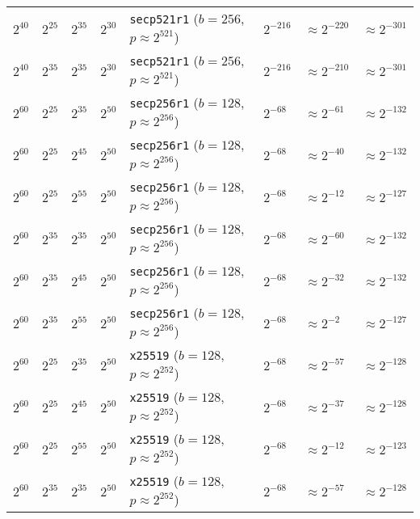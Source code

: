 \begin{table}[p]
{\begin{tabular}{@{}llllllll@{}}
\midrule
$2^{40}$	&$2^{25}$	&$2^{35}$	&$2^{30}$	&\texttt{secp521r1} ($b \!=\! 256$, \! $p \!\approx\! 2^{521}$)	&$2^{-216}$	&\cellcolor{green!25}$\approx 2^{-220}$	&\cellcolor{green!25}$\approx 2^{-301}$	\\
$2^{40}$	&$2^{35}$	&$2^{35}$	&$2^{30}$	&\texttt{secp521r1} ($b \!=\! 256$, \! $p \!\approx\! 2^{521}$)	&$2^{-216}$	&$\approx 2^{-210}$	& \cellcolor{green!25}$\approx 2^{-301}$	\\
\midrule[1pt]
$2^{60}$	&$2^{25}$	&$2^{35}$	&$2^{50}$	&\texttt{secp256r1} ($b \!=\! 128$, \! $p \!\approx\! 2^{256}$)	&$2^{-68}$	&$\approx 2^{-61}$	& \cellcolor{green!25}$\approx 2^{-132}$	\\
$2^{60}$	&$2^{25}$	&$2^{45}$	&$2^{50}$	&\texttt{secp256r1} ($b \!=\! 128$, \! $p \!\approx\! 2^{256}$)	&$2^{-68}$	&$\approx 2^{-40}$	& \cellcolor{green!25}$\approx 2^{-132}$	\\
$2^{60}$	&$2^{25}$	&$2^{55}$	&$2^{50}$	&\texttt{secp256r1} ($b \!=\! 128$, \! $p \!\approx\! 2^{256}$)	&$2^{-68}$	&$\approx 2^{-12}$	& \cellcolor{green!25}$\approx 2^{-127}$	\\
$2^{60}$	&$2^{35}$	&$2^{35}$	&$2^{50}$	&\texttt{secp256r1} ($b \!=\! 128$, \! $p \!\approx\! 2^{256}$)	&$2^{-68}$	&$\approx 2^{-60}$	& \cellcolor{green!25}$\approx 2^{-132}$	\\
$2^{60}$	&$2^{35}$	&$2^{45}$	&$2^{50}$	&\texttt{secp256r1} ($b \!=\! 128$, \! $p \!\approx\! 2^{256}$)	&$2^{-68}$	&$\approx 2^{-32}$	& \cellcolor{green!25}$\approx 2^{-132}$	\\
$2^{60}$	&$2^{35}$	&$2^{55}$	&$2^{50}$	&\texttt{secp256r1} ($b \!=\! 128$, \! $p \!\approx\! 2^{256}$)	&$2^{-68}$	&$\approx 2^{-2}$	& \cellcolor{green!25}$\approx 2^{-127}$	\\
\midrule
$2^{60}$	&$2^{25}$	&$2^{35}$	&$2^{50}$	&\texttt{x25519} ($b \!=\! 128$, \! $p \!\approx\! 2^{252}$)	&$2^{-68}$	&$\approx 2^{-57}$	& \cellcolor{green!25}$\approx 2^{-128}$	\\
$2^{60}$	&$2^{25}$	&$2^{45}$	&$2^{50}$	&\texttt{x25519} ($b \!=\! 128$, \! $p \!\approx\! 2^{252}$)	&$2^{-68}$	&$\approx 2^{-37}$	& \cellcolor{green!25}$\approx 2^{-128}$	\\
$2^{60}$	&$2^{25}$	&$2^{55}$	&$2^{50}$	&\texttt{x25519} ($b \!=\! 128$, \! $p \!\approx\! 2^{252}$)	&$2^{-68}$	&$\approx 2^{-12}$	& \cellcolor{green!25}$\approx 2^{-123}$	\\
$2^{60}$	&$2^{35}$	&$2^{35}$	&$2^{50}$	&\texttt{x25519} ($b \!=\! 128$, \! $p \!\approx\! 2^{252}$)	&$2^{-68}$	&$\approx 2^{-57}$	& \cellcolor{green!25}$\approx 2^{-128}$	\\

\end{tabular}}
\end{table}
